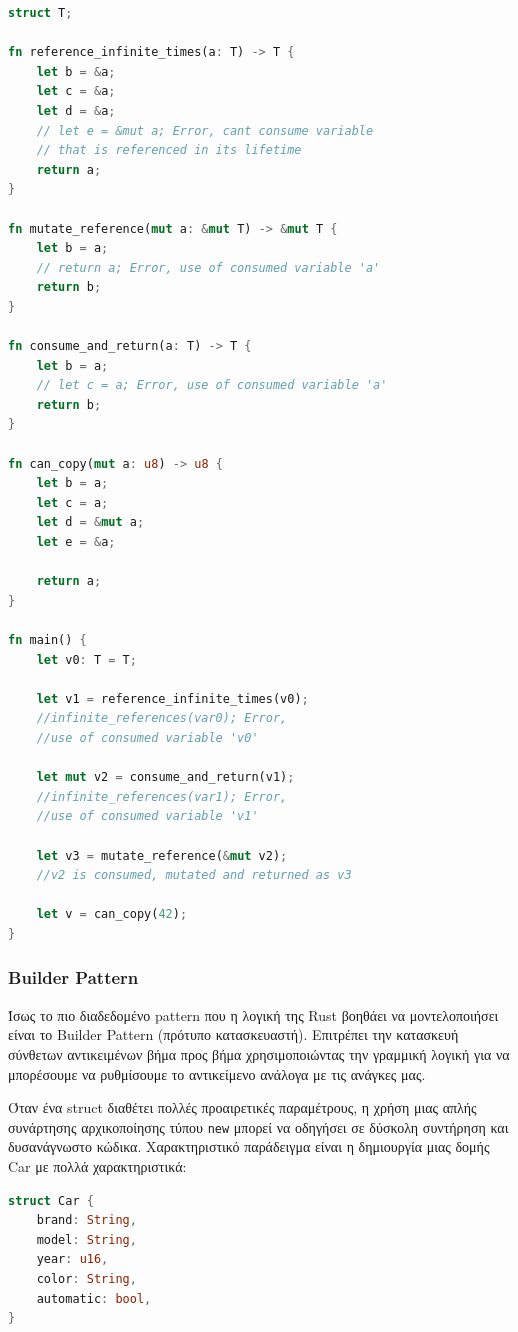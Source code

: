 \begin{lstlisting}[language=Rust]
struct T;

fn reference_infinite_times(a: T) -> T {
    let b = &a;
    let c = &a;
    let d = &a;
    // let e = &mut a; Error, cant consume variable
    // that is referenced in its lifetime
    return a;
}

fn mutate_reference(mut a: &mut T) -> &mut T {
    let b = a;
    // return a; Error, use of consumed variable 'a'
    return b;
}

fn consume_and_return(a: T) -> T {
    let b = a;
    // let c = a; Error, use of consumed variable 'a'
    return b;
}

fn can_copy(mut a: u8) -> u8 {
    let b = a;
    let c = a;
    let d = &mut a;
    let e = &a;

    return a;
}

fn main() {
    let v0: T = T;

    let v1 = reference_infinite_times(v0);
    //infinite_references(var0); Error,
    //use of consumed variable 'v0'

    let mut v2 = consume_and_return(v1);
    //infinite_references(var1); Error,
    //use of consumed variable 'v1'

    let v3 = mutate_reference(&mut v2);
    //v2 is consumed, mutated and returned as v3

    let v = can_copy(42);
}
\end{lstlisting}

\subsubsection{Builder Pattern}

Ίσως το πιο διαδεδομένο pattern που η λογική της Rust βοηθάει να μοντελοποιήσει
είναι το Builder Pattern (πρότυπο κατασκευαστή). Επιτρέπει την κατασκευή
σύνθετων αντικειμένων βήμα προς βήμα χρησιμοποιώντας την γραμμική λογική
για να μπορέσουμε να ρυθμίσουμε το αντικείμενο ανάλογα με τις ανάγκες μας.

Όταν ένα struct διαθέτει πολλές προαιρετικές παραμέτρους, η χρήση μιας
απλής συνάρτησης αρχικοποίησης τύπου \verb|new| μπορεί να οδηγήσει σε δύσκολη
συντήρηση και δυσανάγνωστο κώδικα. Χαρακτηριστικό παράδειγμα είναι η
δημιουργία μιας δομής Car με πολλά χαρακτηριστικά:

\begin{lstlisting}[language=Rust]
struct Car {
    brand: String,
    model: String,
    year: u16,
    color: String,
    automatic: bool,
}
\end{lstlisting}


